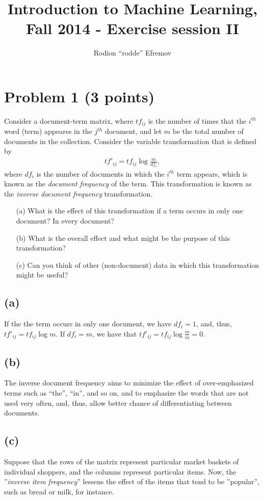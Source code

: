 \documentclass[10pt]{article}
\title{Introduction to Machine Learning, Fall 2014 - Exercise session II}
\author{Rodion ``rodde'' Efremov}
\begin{document}
 \maketitle

\color{red}
\section*{Problem 1 (3 points)}
Consider a document-term matrix, where $tf_{ij}$ is the number of times that the $i^{th}$ word (term) appeares in the $j^{th}$ document, and let $m$ be the total number of documents in the collection. Consider the variable transformation that is defined by
\begin{align}
tf'_{ij} = tf_{ij} \log \frac{m}{df_i},
\end{align}
where $df_i$ is the number of documents in which the $i^{th}$ term appears, which is known as the \textit{document frequency} of the term. This transformation is known as the \textit{inverse document frequency} transformation.
\begin{itemize}
\item[(a)] What is the effect of this transformation if a term occurs in only one document? In every document?
\item[(b)] What is the overall effect and what might be the purpose of this transformation?
\item[(c)] Can you think of other (non-document) data in which this transformation might be useful?
\end{itemize}

\color{black}
\subsection*{(a)}
If the the term occurs in only one document, we have $df_i = 1$, and, thus, $tf'_{ij} = tf_{ij}\log m$. If $df_i = m$, we have that $tf'_{ij} = tf_{ij}\log \frac{m}{m} = 0$.

\subsection*{(b)}
The inverse document frequency aims to minimize the effect of over-emphasized terms such as ``the'', ``in'', and so on, and to emphasize the words that are not used very often, and, thus, allow better chance of differentiating between documents.

\subsection*{(c)}
Suppose that the rows of the matrix represent particular market baskets of individual shoppers, and the columns represent particular items. Now, the ''\textit{inverse item frequency}'' lessens the effect of the items that tend to be ''popular'', such as bread or milk, for instance.
\end{document}

